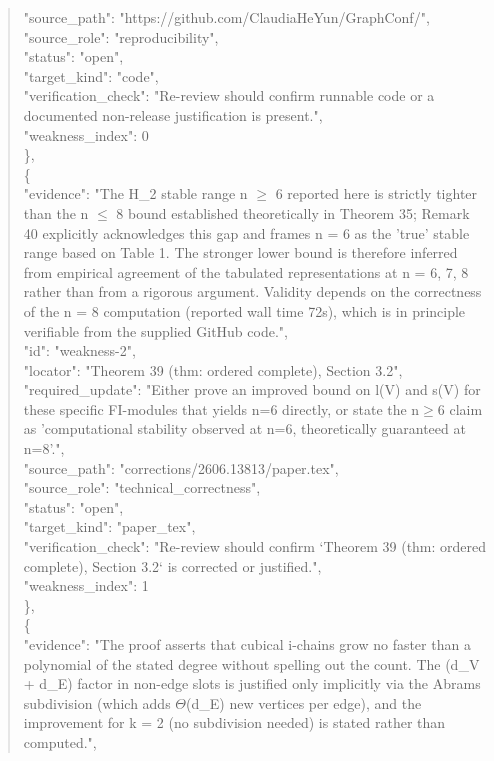 \documentclass[11pt]{article}
\begin{document}
\begin{quote}
      "source\_path": "https://github.com/ClaudiaHeYun/GraphConf/",\\
      "source\_role": "reproducibility",\\
      "status": "open",\\
      "target\_kind": "code",\\
      "verification\_check": "Re-review should confirm runnable code or a documented non-release justification is present.",\\
      "weakness\_index": 0\\
    \},\\
    \{\\
      "evidence": "The H\_2 stable range n \ensuremath{\ge} 6 reported here is strictly tighter than the n \ensuremath{\le} 8 bound established theoretically in Theorem 35; Remark 40 explicitly acknowledges this gap and frames n = 6 as the 'true' stable range based on Table 1. The stronger lower bound is therefore inferred from empirical agreement of the tabulated representations at n = 6, 7, 8 rather than from a rigorous argument. Validity depends on the correctness of the n = 8 computation (reported wall time 72s), which is in principle verifiable from the supplied GitHub code.",\\
      "id": "weakness-2",\\
      "locator": "Theorem 39 (thm: ordered complete), Section 3.2",\\
      "required\_update": "Either prove an improved bound on l(V) and s(V) for these specific FI-modules that yields n=6 directly, or state the n\ensuremath{\ge}6 claim as 'computational stability observed at n=6, theoretically guaranteed at n=8'.",\\
      "source\_path": "corrections/2606.13813/paper.tex",\\
      "source\_role": "technical\_correctness",\\
      "status": "open",\\
      "target\_kind": "paper\_tex",\\
      "verification\_check": "Re-review should confirm `Theorem 39 (thm: ordered complete), Section 3.2` is corrected or justified.",\\
      "weakness\_index": 1\\
    \},\\
    \{\\
      "evidence": "The proof asserts that cubical i-chains grow no faster than a polynomial of the stated degree without spelling out the count. The (d\_V + d\_E) factor in non-edge slots is justified only implicitly via the Abrams subdivision (which adds \ensuremath{\Theta}(d\_E) new vertices per edge), and the improvement for k = 2 (no subdivision needed) is stated rather than computed.",\\

\end{quote}
\end{document}
